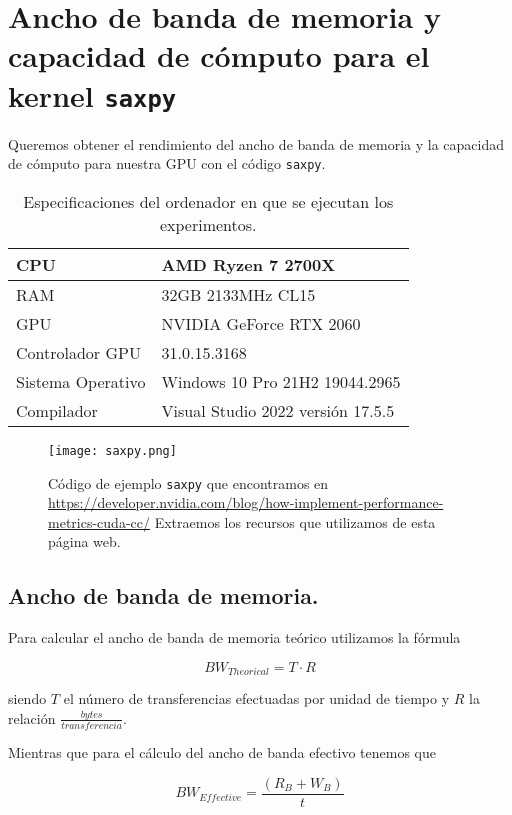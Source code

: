 \section{Ancho de banda de memoria y capacidad de cómputo para el kernel \texttt{saxpy}}

Queremos obtener el rendimiento del ancho de banda de memoria y la capacidad de cómputo para nuestra
GPU con el código \texttt{saxpy}.

\begin{table}[H]
	\centering
	\begin{tabular}{|l|l|}
	\hline
	CPU               & AMD Ryzen 7 2700X                 \\ \hline
	RAM               & 32GB 2133MHz CL15				  \\ \hline
	GPU               & NVIDIA GeForce RTX 2060           \\ \hline
	Controlador GPU   & 31.0.15.3168                      \\ \hline
	Sistema Operativo & Windows 10 Pro 21H2 19044.2965    \\ \hline
	Compilador        & Visual Studio 2022 versión 17.5.5 \\ \hline
	\end{tabular}
	\caption{Especificaciones del ordenador en que se ejecutan los experimentos.}
\end{table}

\begin{figure}[H]
    \centering
    \texttt{[image: saxpy.png]}
    \caption{Código de ejemplo \texttt{saxpy} que encontramos en \url{https://developer.nvidia.com/blog/how-implement-performance-metrics-cuda-cc/}
	Extraemos los recursos que utilizamos de esta página web.}
\end{figure}

\subsection{Ancho de banda de memoria.}

Para calcular el ancho de banda de memoria teórico utilizamos la fórmula

$$ BW_{Theorical} = T \cdot R $$

siendo $T$ el número de transferencias efectuadas por unidad de tiempo y $R$ la relación $\frac{bytes}{transferencia}$.

Mientras que para el cálculo del ancho de banda efectivo tenemos que

$$ BW_{Effective} = \frac{(R_{B} + W_{B})}{t} $$

